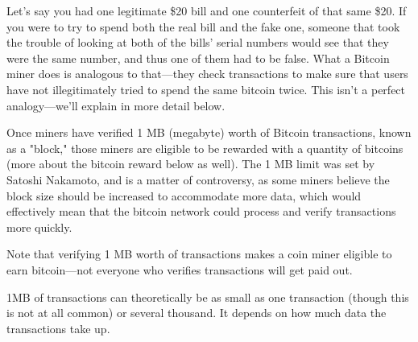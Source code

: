 Let's say you had one legitimate \$20 bill and one counterfeit of that same \$20. If you were to try to spend both the real bill and the fake one, someone that took the trouble of looking at both of the bills' serial numbers would see that they were the same number, and thus one of them had to be false. What a Bitcoin miner does is analogous to that—they check transactions to make sure that users have not illegitimately tried to spend the same bitcoin twice. This isn't a perfect analogy—we'll explain in more detail below.\vspace{.3cm}

Once miners have verified 1 MB (megabyte) worth of Bitcoin transactions, known as a "block," those miners are eligible to be rewarded with a quantity of bitcoins (more about the bitcoin reward below as well). The 1 MB limit was set by Satoshi Nakamoto, and is a matter of controversy, as some miners believe the block size should be increased to accommodate more data, which would effectively mean that the bitcoin network could process and verify transactions more quickly.\vspace{.3cm}

Note that verifying 1 MB worth of transactions makes a coin miner eligible to earn bitcoin—not everyone who verifies transactions will get paid out.\vspace{.3cm}

1MB of transactions can theoretically be as small as one transaction (though this is not at all common) or several thousand. It depends on how much data the transactions take up.\vspace{.3cm}